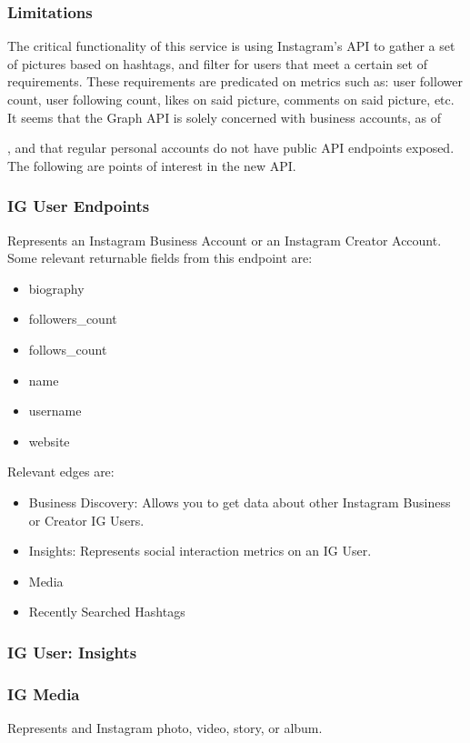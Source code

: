 \subsubsection{Limitations}
The critical functionality of this service is using Instagram's API to gather a set of pictures based on hashtags,
and filter for users that meet a certain set of requirements. These requirements are predicated on metrics such as:
user follower count, user following count, likes on said picture, comments on said picture, etc. It seems that 
the Graph API is solely concerned with business accounts, as of \date{\today}, and that regular personal accounts
do not have public API endpoints exposed. The following are points of interest in the new API.

\subsubsection{IG User Endpoints}
Represents an Instagram Business Account or an Instagram Creator Account. Some relevant returnable fields from
this endpoint are:
\begin{itemize}
    \item biography
    \item followers\_count
    \item follows\_count
    \item name
    \item username
    \item website
\end{itemize}

Relevant edges are:
\begin{itemize}
    \item Business Discovery: Allows you to get data about other Instagram Business or Creator IG Users.
    \item Insights: Represents social interaction metrics on an IG User. 
    \item Media
    \item Recently Searched Hashtags
\end{itemize}


\subsubsection{IG User: Insights}

\subsubsection{IG Media}
Represents and Instagram photo, video, story, or album.

